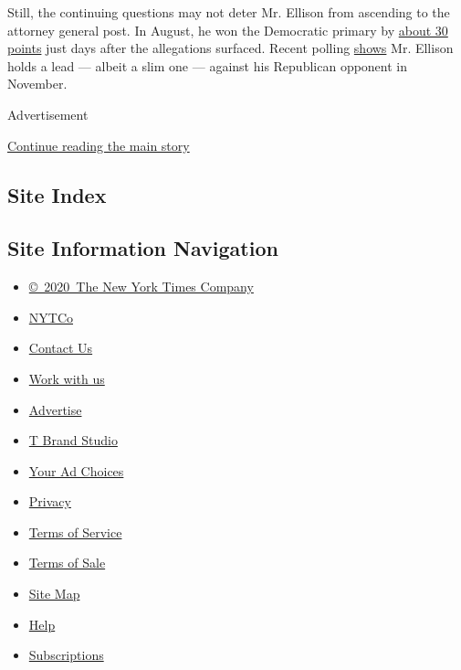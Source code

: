 Still, the continuing questions may not deter Mr. Ellison from ascending
to the attorney general post. In August, he won the Democratic primary
by
\href{https://www.nytimes3xbfgragh.onion/interactive/2018/08/14/us/elections/results-minnesota-primary-elections.html}{about
30 points} just days after the allegations surfaced. Recent polling
\href{https://www.mprnews.org/story/2018/09/18/minnesota-poll-ag-race-close-as-ellison-abuse-accusation-lingers}{shows}
Mr. Ellison holds a lead --- albeit a slim one --- against his
Republican opponent in November.

Advertisement

\protect\hyperlink{after-bottom}{Continue reading the main story}

\hypertarget{site-index}{%
\subsection{Site Index}\label{site-index}}

\hypertarget{site-information-navigation}{%
\subsection{Site Information
Navigation}\label{site-information-navigation}}

\begin{itemize}
\tightlist
\item
  \href{https://help.nytimes3xbfgragh.onion/hc/en-us/articles/115014792127-Copyright-notice}{©~2020~The
  New York Times Company}
\end{itemize}

\begin{itemize}
\tightlist
\item
  \href{https://www.nytco.com/}{NYTCo}
\item
  \href{https://help.nytimes3xbfgragh.onion/hc/en-us/articles/115015385887-Contact-Us}{Contact
  Us}
\item
  \href{https://www.nytco.com/careers/}{Work with us}
\item
  \href{https://nytmediakit.com/}{Advertise}
\item
  \href{http://www.tbrandstudio.com/}{T Brand Studio}
\item
  \href{https://www.nytimes3xbfgragh.onion/privacy/cookie-policy\#how-do-i-manage-trackers}{Your
  Ad Choices}
\item
  \href{https://www.nytimes3xbfgragh.onion/privacy}{Privacy}
\item
  \href{https://help.nytimes3xbfgragh.onion/hc/en-us/articles/115014893428-Terms-of-service}{Terms
  of Service}
\item
  \href{https://help.nytimes3xbfgragh.onion/hc/en-us/articles/115014893968-Terms-of-sale}{Terms
  of Sale}
\item
  \href{https://spiderbites.nytimes3xbfgragh.onion}{Site Map}
\item
  \href{https://help.nytimes3xbfgragh.onion/hc/en-us}{Help}
\item
  \href{https://www.nytimes3xbfgragh.onion/subscription?campaignId=37WXW}{Subscriptions}
\end{itemize}
